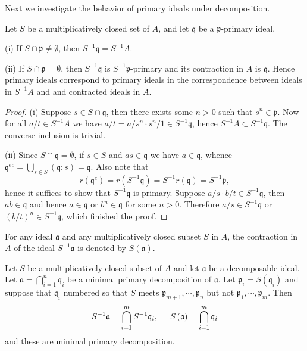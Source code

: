 Next we investigate the behavior of primary ideals under decomposition.
\begin{proposition}
Let $S$ be a multiplicatively closed set of $A$, and let $\mathfrak{q}$ be a $\mathfrak{p}$-primary ideal.\par
(i) If $S\cap\mathfrak{p}\ne\emptyset$, then $S^{-1}\mathfrak{q}=S^{-1}A$.\par
(ii) If $S\cap\mathfrak{p}=\emptyset$, then $S^{-1}\mathfrak{q}$ is $S^{-1}\mathfrak{p}$-primary and its contraction in $A$ is $\mathfrak{q}$. Hence primary ideals correspond to primary ideals in the correspondence between ideals in $S^{-1}A$ and and contracted ideals in $A$.
\end{proposition}
\begin{proof}
(i) Suppose $s\in S\cap\mathfrak{q}$, then there exists some $n>0$ such that $s^n\in\mathfrak{p}$. Now for all $a/t\in S^{-1}A$ we have $a/t=a/s^n\cdot s^n/1\in S^{-1}\mathfrak{q}$, hence $S^{-1}A\subset S^{-1}\mathfrak{q}$. The converse inclusion is trivial.\par
(ii) Since $S\cap\mathfrak{q}=\emptyset$, if $s\in S$ and $as\in\mathfrak{q}$ we have $a\in\mathfrak{q}$, whence $\mathfrak{q} ^{ec}=\bigcup_{s\in S}{\left( \mathfrak{q} :s \right)}=\mathfrak{q}$. Also note that 
$$
r\left( \mathfrak{q} ^e \right) =r\left( S^{-1}\mathfrak{q} \right) =S^{-1}r\left( \mathfrak{q} \right) =S^{-1}\mathfrak{p} ,
$$
hence it suffices to show that $S^{-1}\mathfrak{q}$ is primary. Suppose $a/s\cdot b/t\in S^{-1}\mathfrak{q}$, then $ab\in\mathfrak{q}$ and hence $a\in\mathfrak{q}$ or $b^n\in\mathfrak{q}$ for some $n>0$. Therefore $a/s\in S^{-1}\mathfrak{q}$ or $(b/t)^n\in S^{-1}\mathfrak{q}$, which finished the proof.
\end{proof}
For any ideal $\mathfrak{a}$ and any multiplicatively closed subset $S$ in $A$, the contraction in $A$ of the ideal $S^{-1}\mathfrak{a}$ is denoted by $S(\mathfrak{a})$.
\begin{proposition}
Let $S$ be a multiplicatively closed subset of $A$ and let $\mathfrak{a}$ be a decomposable ideal. Let $\mathfrak{a}=\bigcap_{i=1}^n\mathfrak{q}_i$ be a minimal primary decomposition of $\mathfrak{a}$. Let $\mathfrak{p}_i=S(\mathfrak{q}_i)$ and suppose that $\mathfrak{q}_i$ numbered so that $S$ meets $\mathfrak{p}_{m+1},\cdots,\mathfrak{p}_n$ but not $\mathfrak{p}_1,\cdots,\mathfrak{p}_m$. Then 
$$
S^{-1}\mathfrak{a} =\bigcap_{i=1}^m{S^{-1}\mathfrak{q} _i},\hspace{0.5cm}S\left( \mathfrak{a} \right) =\bigcap_{i=1}^m{\mathfrak{q} _i}
$$
and these are minimal primary decomposition.
\end{proposition}
